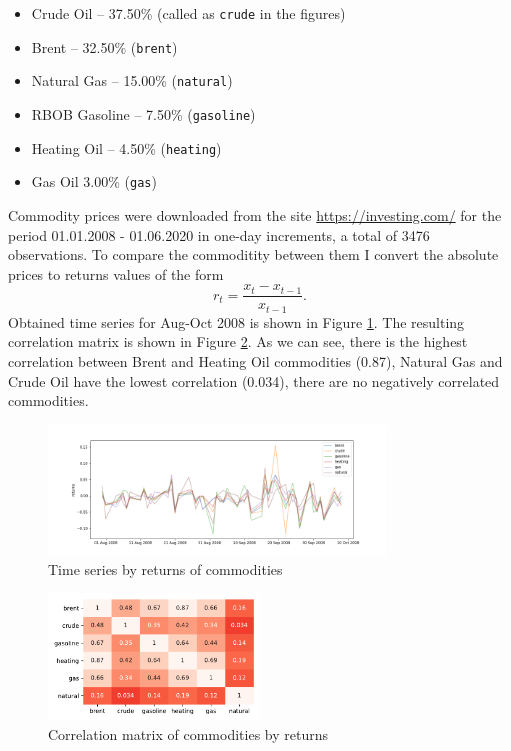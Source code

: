 \documentclass{article}
\begin{document}
\begin{itemize}
    \item Crude Oil -- 37.50\% (called as \texttt{crude} in the figures)
    \item Brent -- 32.50\% (\texttt{brent})
    \item Natural Gas -- 15.00\% (\texttt{natural})
    \item RBOB Gasoline -- 7.50\% (\texttt{gasoline})
    \item Heating Oil -- 4.50\% (\texttt{heating})
    \item Gas Oil 3.00\% (\texttt{gas})
\end{itemize}

Commodity prices were downloaded from the site \url{https://investing.com/} for the period 01.01.2008 - 01.06.2020 in one-day increments, a total of 3476 observations. To compare the commoditity between them I convert the absolute prices to returns values of the form
$$r_t = \frac{x_t - x_{t-1}}{x_{t-1}}.$$
Obtained time series for Aug-Oct 2008 is shown in Figure \ref{fig:returns}. The resulting correlation matrix is shown in Figure \ref{fig:heatmap}. As we can see, there is the highest correlation between Brent and Heating Oil commodities (0.87), Natural Gas and Crude Oil have the lowest correlation (0.034), there are no negatively correlated commodities.

\begin{figure}[h]
    \centering
    \includegraphics[width=0.8\textwidth]{pics/returns.png}
    \caption{Time series by returns of commodities}
    \label{fig:returns}
\end{figure}

\begin{figure}[h]
    \centering
    \includegraphics[width=0.5\textwidth]{pics/heatmap.pdf}
    \caption{Correlation matrix of commodities by returns}
    \label{fig:heatmap}
\end{figure}
\end{document}
